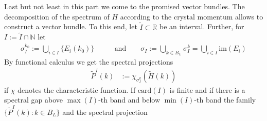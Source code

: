 \\
\\
Last but not least in this part we come to the promised vector bundles. The decomposition of the spectrum of $H$ according to the crystal momentum allows to construct a vector bundle. To this end, let $\tilde{I} \subset \mathbb{R}$ be an interval. Further, for $I := \tilde{I} \cap \mathbb{N}$ let
\begin{align*}
  \sigma_{I}^{k_{0}}
  :=
  \bigcup_{i \in I}
  \lbrace
    E_{i}(k_{0})
  \rbrace
  \qquad
  &\text{and}
  \qquad
  \sigma_{I}
  :=
  \bigcup_{k \in B_{L}}
  \sigma_{I}^{k}
  =
  \bigcup_{i \in I}
  \mathrm{im}(E_{i})
\end{align*}
By functional calculus we get the spectral projections
\begin{align*}
  \tilde{P}^{I}(k)
  &:=
  \chi_{\sigma_{I}^{k}}(\tilde{H}(k))
\end{align*}
if $\chi$ denotes the characteristic function. If $\mathrm{card}(I)$ is finite and if there is a spectral gap above $\max(I)$-th band and below $\min(I)$-th band the family $\lbrace \tilde{P}^{I}(k) \colon k \in B_{L} \rbrace$ and the spectral projection
